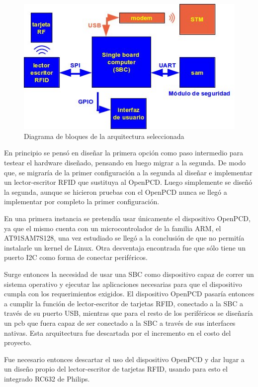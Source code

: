 \begin{figure}[H]
\centering
  \begin{center}
  \includegraphics[scale=.5]{Imagenes/arq_def.jpg} 
  \end{center}
  \caption{Diagrama de bloques de la arquitectura seleccionada}\label{Fig:HW} 
\end{figure}

En principio se pensó en diseñar la primera opción como paso intermedio para testear el hardware diseñado, pensando en luego migrar a la segunda. De modo que, se migraría de la primer configuración a la segunda al diseñar e implementar un lector-escritor RFID que sustituya al OpenPCD.
Luego simplemente se diseñó la segunda, aunque se hicieron pruebas con el OpenPCD nunca se llegó a implementar por completo la primer configuración.

En una primera instancia se pretendía usar únicamente el dispositivo OpenPCD, ya que el mismo cuenta con un microcontrolador de la familia ARM, el AT91SAM7S128, una vez estudiado se llegó a la conclusión de que no permitía instalarle un kernel de Linux. Otra desventaja encontrada fue que sólo tiene un puerto I2C como forma de conectar periféricos.

Surge entonces la necesidad de usar una SBC como dispositivo capaz de correr un sistema operativo y ejecutar las aplicaciones necesarias para que el dispositivo cumpla con los requerimientos exigidos. El dispositivo OpenPCD pasaría entonces a cumplir la función de lector-escritor de tarjetas RFID, conectado a la SBC a través de su puerto USB, mientras que para el resto de los periféricos se diseñaría un pcb que fuera capaz de ser conectado a la SBC a través de sus interfaces nativas. Esta arquitectura fue descartada por el incremento en el costo del proyecto.

Fue necesario entonces descartar el uso del dispositivo OpenPCD y dar lugar a un diseño propio del lector-escritor de tarjetas RFID, usando para esto el integrado RC632 de Philips.

